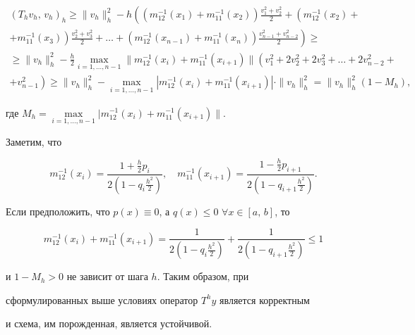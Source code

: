 \begin{multline*}

(T_h v_h,\,v_h )_h \ge \| v_h \|_h^2 -h\left(\left(m_{12}^{-1} (x_1

)+m_{11}^{-1} (x_2)\right)\frac{v_1^2 +v_2^2 }{2}+\left(m_{12}^{-1} (x_2)+ \right.\right.\\

\left.\left.+m_{11}^{-1}

(x_3) \right)\frac{v_2^2 +v_3^2}{2}+ \ldots+\left(m_{12}^{-1} (x_{n-1})+m_{11}^{-1} (x_n) \right)

\frac{v_{n-1}^2 +v_{n-2}^2}{2}\right)\ge \\

\ge \| v_h\|_h^2 -\frac{h}{2}\max \limits_{i=1,\ldots,n-1} \|m_{12}^{-1}(x_i)+m_{11}^{-1} (x_{i+1})\|

\left(v_1^2 +2v_2^2 +2v_3^2

+\ldots+2v_{n-2}^2 + \right. \\

\left.+v_{n-1}^2 \right)\ge \| v_h \|_h^2 -\max \limits_{i=1,\ldots,n-1}

\left|m_{12}^{-1} (x_i)+m_{11}^{-1} (x_{i+1})\right| \cdot \|v_h\|_h^2 =\| v_h \|_h^2 (1-M_h),

\end{multline*}

где $M_h =\max \limits_{i=1,\ldots,n-1} |m_{12}^{-1}(x_i)+m_{11}^{-1}(x_{i+1})\|$.

Заметим, что

\[

m_{12}^{-1} (x_i )=\frac{1+\frac{h}{2}p_i }{2(1-q_i \frac{h^2}{2})}, \quad

m_{11}^{-1} (x_{i+1})=\frac{1-\frac{h}{2}p_{i+1}}{2(1-q_{i+1}

\frac{h^2}{2})}.

\]

Если предположить, что $p(x)\equiv 0$, а $q(x)\le 0$ $\forall x\in

[a,\,b]$, то

\[

m_{12}^{-1} (x_i)+m_{11}^{-1} (x_{i+1})=\frac{1}{2(1-q_i\frac{h^2}{2})}+\frac{1}{2(1-q_{i+1} \frac{h^2}{2})}\le 1

\]

и $1-M_h >0$ не зависит от шага $h$. Таким образом, при

сформулированных выше условиях оператор $T^hy$ является корректным

и схема, им порожденная, является устойчивой.



